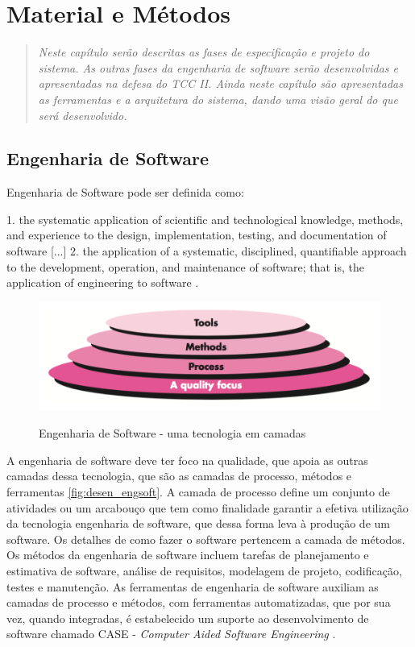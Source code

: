 \chapter{Material e Métodos}
\begin{quote}\normalfont\itshape\vspace*{-2\baselineskip}
  Neste capítulo serão descritas as fases de especificação e projeto do sistema. As
  outras fases da engenharia de software serão desenvolvidas e apresentadas na
  defesa do TCC II. Ainda neste capítulo são apresentadas as ferramentas e a arquitetura
  do sistema, dando uma visão geral do que será desenvolvido.
\end{quote}

\section{Engenharia de Software}

Engenharia de Software pode ser definida como:
\begin{citacao}[english]
1. the systematic application of scientific and technological knowledge, methods, and experience to the design,
implementation, testing, and documentation of software [...]  2. the application
of a systematic, disciplined, quantifiable approach to the development, operation,
and maintenance of software; that is, the application of engineering to software \cite{IEEE2010}.
\end{citacao}

\begin{figure}[!b]
  \centering
  \caption{Engenharia de Software - uma tecnologia em camadas}
  \includegraphics[scale=0.33]{imagens/desenv_engsoft2}
  \label{fig:desen_engsoft}
\end{figure}

A engenharia de software deve ter foco na qualidade, que apoia as outras camadas
dessa tecnologia, que são as camadas de processo, métodos e ferramentas \autoref{fig:desen_engsoft}.
A camada de processo define um conjunto de atividades ou um arcabouço que tem
como finalidade garantir a efetiva utilização da tecnologia engenharia de software, que dessa forma
leva à produção de um software. Os detalhes de como fazer o software pertencem
a camada de métodos. Os métodos da engenharia de software incluem tarefas de planejamento
e estimativa de software, análise de requisitos, modelagem de projeto, codificação,
testes e manutenção. As ferramentas de engenharia de software auxiliam as camadas de
processo e métodos, com ferramentas automatizadas, que por sua vez, quando integradas,
é estabelecido um suporte ao desenvolvimento de software chamado CASE -
\textit{Computer Aided Software Engineering} \cite{Pressman2009, Sommerville2006}.

